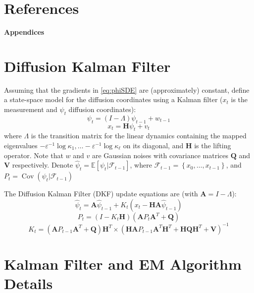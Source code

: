 \documentclass[11pt]{article}
\theoremstyle{plain}
\theoremstyle{definition}
\theoremstyle{remark}
\numberwithin{equation}{section}
\newcommand{\veps}{\varepsilon}
\newcommand{\Cov}{\operatorname{Cov}}
\begin{document}
\section*{References}
\printbibliography[heading=none]
\newpage

\appendix

\renewcommand{\thesubsection}{\Alph{section}.\arabic{subsection}}
\setcounter{table}{0}
\setcounter{figure}{0}
\renewcommand{\thetable}{\Alph{section}.\arabic{table}}
\renewcommand{\thefigure}{\Alph{section}.\arabic{figure}}

\begin{center}
\bf{\huge Appendices}
\end{center}

\section{Diffusion Kalman Filter}
\label{sec:appa}

Assuming that the gradients in \eqref{eq:phiSDE} are (approximately) constant, \citet{shnitzer2020diffusion}
define a state-space model for the diffusion coordinates using a Kalman filter ($x_t$ is the measurement and $\psi_t$ diffusion coordinates):
\[\psi_t = (I - \Lambda)\psi_{t-1} + {w}_{t-1}\]
\[x_t = \mathbf{H} \psi_t + {v}_t\]
where $\Lambda$ is the transition matrix for the linear dynamics containing the mapped eigenvalues \newline ${-\veps^{-1}\log \kappa_1,\dots -\veps^{-1}\log \kappa_\ell}$ on its diagonal, and $\mathbf{H}$ is the lifting operator. Note that ${w}$ and ${v}$ are Gaussian noises with covariance matrices $\mathbf{Q}$ and $\mathbf{V}$ respectively.
Denote $\hat{\psi}_t = \mathbb{E} [ \psi_t | \mathcal{F}_{t-1}]$, where $\mathcal{F}_{t-1} = \left \{x_0,\ldots,x_{t-1} \right \}$, and  
$P_t = \Cov(\psi_t | \mathcal{F}_{t-1})$

The Diffusion Kalman Filter (DKF) update equations are (with $\mathbf{A}=I - \Lambda$):
\[\hat{\psi}_t = \mathbf{A}\hat{\psi}_{t-1} + K_t \left( x_t - \mathbf{H} \mathbf{A}\hat{\psi}_{t-1} \right)\]
\[P_t = (I - K_t \mathbf{H}) \left( \mathbf{A} P_t \mathbf{A}^T + \mathbf{Q} \right)\]
\[K_t = \left( \mathbf{A} P_{t-1} \mathbf{A}^T + \mathbf{Q} \right) \mathbf{H}^T \nonumber \times \left( \mathbf{H} \mathbf{A} P_{t-1} \mathbf{A}^T \mathbf{H}^T + \mathbf{H} \mathbf{Q} \mathbf{H}^T + \mathbf{V} \right)^{-1}\]

\section{Kalman Filter and EM Algorithm Details}
\label{app:kalman_em_details}
\end{document}
